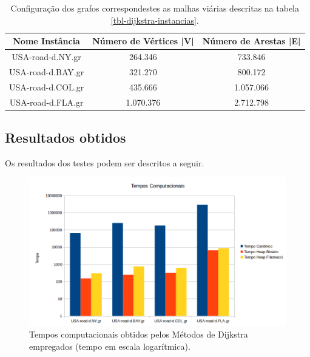 \begin{table}[H]
\caption{Configuração dos grafos correspondestes as malhas viárias descritas na tabela \ref{tbl-dijkstra-instancias}.}
\label{tbl-dijkstra-configuracao}
\centering
\begin{adjustbox}{max width=\textwidth}
\begin{tabular}{|c|c|c|}
\hline 
\textbf{Nome Instância} & \textbf{Número de Vértices |V|} & \textbf{Número de Arestas |E|} \\ 
\hline 
USA-road-d.NY.gr
 & 264.346
 & 733.846
 \\ 
\hline 
USA-road-d.BAY.gr
 & 321.270
 & 800.172
 \\ 
\hline 
USA-road-d.COL.gr
 & 435.666
 & 1.057.066
 \\ 
\hline 
USA-road-d.FLA.gr
 & 1.070.376
 & 2.712.798
 \\ 
\hline 
\end{tabular}
\end{adjustbox} 
\end{table}

\subsection{Resultados obtidos}
\label{sec-dijkstra-experimentos-resultados}
Os resultados dos testes podem ser descritos a seguir.

\begin{figure}[H]
\centering
\includegraphics[width=.90\textwidth]{figuras/dijkstra-tempos} 
\caption{Tempos computacionais obtidos pelos Métodos de Dijkstra empregados (tempo em escala logarítmica).}
\label{fig-dijkstra-resultados-tempos}
\end{figure}

